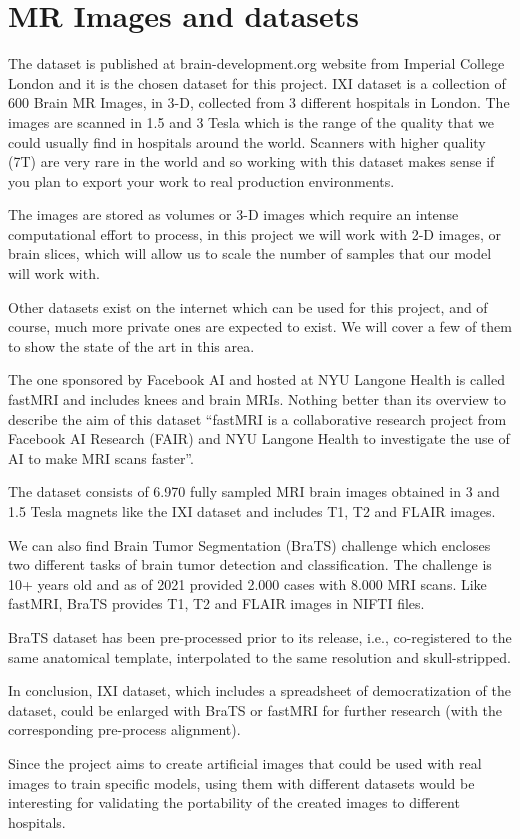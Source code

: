 \section{MR Images and datasets}

The  dataset is published at brain-development.org website from Imperial College London and it is the chosen dataset for this project. IXI dataset is a collection of 600 Brain MR Images, in 3-D, collected from 3 different hospitals in London. The images are scanned in 1.5 and 3 Tesla which is the range of the quality that we could usually find in hospitals around the world. Scanners with higher quality (7T) are very rare in the world and so working with this dataset makes sense if you plan to export your work to real production environments.

The images are stored as volumes or 3-D images which require an intense computational effort to process, in this project we will work with 2-D images, or brain slices, which will allow us to scale the number of samples that our model will work with.

Other datasets exist on the internet which can be used for this project, and of course, much more private ones are expected to exist. We will cover a few of them to show the state of the art in this area.

The one sponsored by Facebook AI and hosted at NYU Langone Health is called fastMRI and includes knees and brain MRIs. Nothing better than its overview to describe the aim of this dataset “fastMRI is a collaborative research project from Facebook AI Research (FAIR) and NYU Langone Health to investigate the use of AI to make MRI scans faster”. 

The dataset consists of 6.970 fully sampled MRI brain images obtained in 3 and 1.5 Tesla magnets like the IXI dataset and includes T1, T2 and FLAIR images.

We can also find Brain Tumor Segmentation (BraTS) challenge \cite{brats} which encloses two different tasks of brain tumor detection and classification. The challenge is 10+ years old and as of 2021 provided 2.000 cases with 8.000 MRI scans. Like fastMRI, BraTS provides T1, T2 and FLAIR images in NIFTI files.

BraTS dataset has been pre-processed prior to its release, i.e., co-registered to the same anatomical template, interpolated to the same resolution and skull-stripped.

In conclusion, IXI dataset, which includes a spreadsheet of democratization of the dataset, could be enlarged with BraTS or fastMRI for further research (with the corresponding pre-process alignment).

Since the project aims to create artificial images that could be used with real images to train specific models, using them with different datasets would be interesting for validating the portability of the created images to different hospitals. 